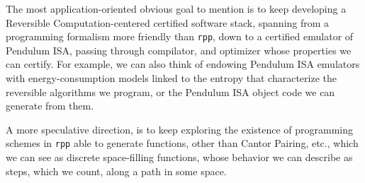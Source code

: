 \documentclass[preprint]{elsarticle}
\theoremstyle{remark}
\newcommand{\PISA}{\textsf{Pendulum ISA}\xspace}
\begin{document}
The most application-oriented obvious goal to mention is to keep developing a Reversible Computa\-tion-centered certified software stack, spanning from a programming formalism more friendly than \lstinline|rpp|, down to a certified emulator of \PISA, passing through compilator, and optimizer whose properties we can certify. For example, we can also think of endowing \PISA emulators with energy-consumption models linked to the entropy that characterize the reversible algorithms we program, or the \PISA object code we can generate from them.

A more speculative direction, is to keep exploring the existence of programming schemes in \lstinline|rpp| able to generate functions, other than Cantor Pairing, etc., which we can see as discrete space-filling functions, whose behavior we can describe as steps, which we count, along a path in some space.




\end{document}
